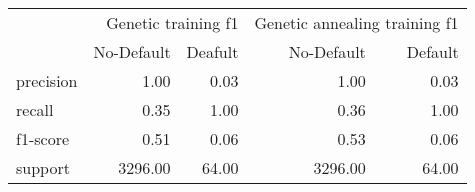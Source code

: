 \begin{table}
\thcenter
\begin{tabular}{lrrrr}
 & \multicolumn{2}{r}{Genetic training f1} & \multicolumn{2}{r}{Genetic annealing training f1} \\
 & No-Default & Deafult & No-Default & Default \\
precision & 1.00 & 0.03 & 1.00 & 0.03 \\
recall & 0.35 & 1.00 & 0.36 & 1.00 \\
f1-score & 0.51 & 0.06 & 0.53 & 0.06 \\
support & 3296.00 & 64.00 & 3296.00 & 64.00 \\
\end{tabular}
\end{table}
